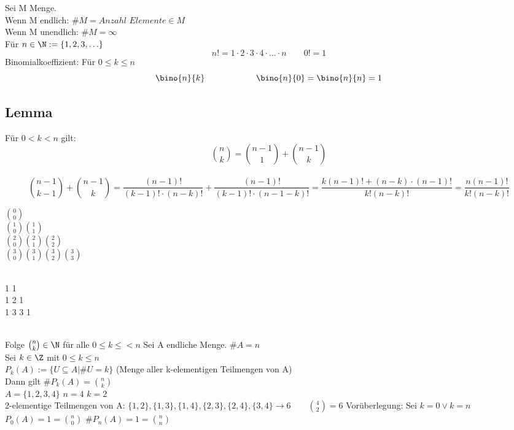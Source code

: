 %
\wdh
Sei M Menge.\\
Wenn M endlich: $\#M=Anzahl$ $Elemente\in M$\\
Wenn M unendlich: $\#M=\infty$\\
Für $n\in \N:=\{1,2,3,\ldots\}$\\
$$n!=1 · 2 · 3 · 4 · … · n \qquad 0!=1$$
Binomialkoeffizient: Für $0\leq k\leq n$\\
$$\bino{n}{k} \qquad\qquad\qquad \bino{n}{0}=\bino{n}{n}=1$$
%
\subsection{Lemma}
Für $0<k< n$ gilt:
$$\binom{n}{k} = \binom{n -1}{1} + \binom{n-1}{k}$$\\
%
\bew 
$$\binom{n-1}{k-1}+ \binom{n-1}{k}=\frac{(n-1)!}{(k-1)!·(n-k)!} +\frac{(n-1)!}{(k-1)!·(n-1-k)!} = \frac{k(n-1)!+(n-k)\cdot(n-1)!}{k! (n-k)!}=\frac{n(n-1)!}{k!(n-k)!}$$
%
\parbox{0.5\textwidth}{\centering
$\binom{0}{0}$\\
$\binom{1}{0} \binom{1}{1}$\\
$\binom{2}{0} \binom{2}{1} \binom{2}{2}$\\
$\binom{3}{0} \binom{3}{1} \binom{3}{2} \binom{3}{3}$\\}
\parbox{0.5\textwidth}{\\
1 1\\
1 2 1\\
1 3 3 1\\}\\[5mm]
Folge $\binom{n}{k}\in \N$ für alle $0\leq k\leq<n$
%
%
\Satz
Sei A endliche Menge. $\#A=n$\\[4pt]
Sei $k\in\Z$ mit $0\leq k\leq n$\\[4pt]
$P_k(A):=\{U\subseteq A| \#U=k\}$ (Menge aller k-elementigen Teilmengen von A)\\[4pt]
Dann gilt $\#P_k(A)=\binom{n}{k}$\\
\bsp
$A=\{1,2,3,4\}$ $n=4$ $k=2$\\[4pt]
2-elementige Teilmengen von A:
$\{1,2\}, \{1,3\}, \{1,4\}, \{2,3\}, \{2,4\}, \{3,4\} \to 6\qquad \binom{4}{2}=6$ \ok
%
\bew
Vorüberlegung: Sei $k=0 \vee k=n$\\
$P_0(A)=1=\binom{n}{0}$ $\#P_n(A)=1=\binom{n}{n}$\ok\\
